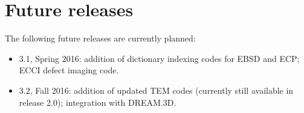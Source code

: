 \documentclass[DIV=calc, paper=letter, fontsize=11pt]{scrartcl}	 %
\begin{document}
\section{Future releases}
The following future releases are currently planned:
\begin{itemize}
	\item 3.1, Spring 2016: addition of dictionary indexing codes for EBSD and ECP; ECCI defect imaging code.
	\item 3.2, Fall 2016: addition of updated TEM codes (currently still available in release 2.0); integration with DREAM.3D.
\end{itemize}
\end{document}
